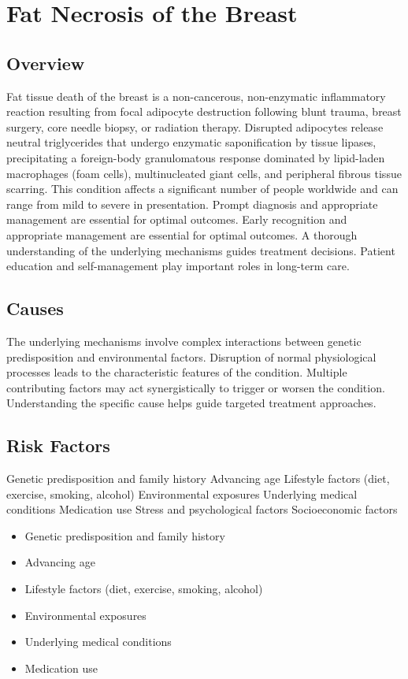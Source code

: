 \chapter{Fat Necrosis of the Breast}
\label{sec:Fat Necrosis of the Breast}

\section{Overview}
Fat tissue death of the breast is a non-cancerous, non-enzymatic inflammatory reaction resulting from focal adipocyte destruction following blunt trauma, breast surgery, core needle biopsy, or radiation therapy. Disrupted adipocytes release neutral triglycerides that undergo enzymatic saponification by tissue lipases, precipitating a foreign-body granulomatous response dominated by lipid-laden macrophages (foam cells), multinucleated giant cells, and peripheral fibrous tissue scarring. This condition affects a significant number of people worldwide and can range from mild to severe in presentation. Prompt diagnosis and appropriate management are essential for optimal outcomes. Early recognition and appropriate management are essential for optimal outcomes. A thorough understanding of the underlying mechanisms guides treatment decisions. Patient education and self-management play important roles in long-term care.
\section{Causes}
The underlying mechanisms involve complex interactions between genetic predisposition and environmental factors. Disruption of normal physiological processes leads to the characteristic features of the condition. Multiple contributing factors may act synergistically to trigger or worsen the condition. Understanding the specific cause helps guide targeted treatment approaches.
\section{Risk Factors}
Genetic predisposition and family history Advancing age Lifestyle factors (diet, exercise, smoking, alcohol) Environmental exposures Underlying medical conditions Medication use Stress and psychological factors Socioeconomic factors

\begin{itemize}[noitemsep]
  \item Genetic predisposition and family history
  \item Advancing age
  \item Lifestyle factors (diet, exercise, smoking, alcohol)
  \item Environmental exposures
  \item Underlying medical conditions
  \item Medication use
\end{itemize}

